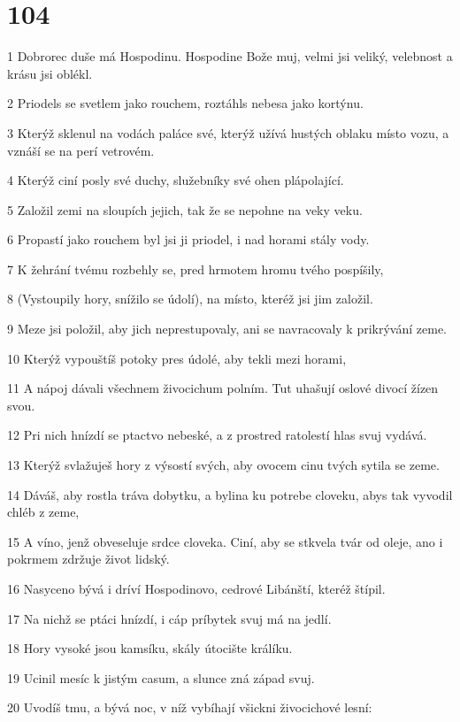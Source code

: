 \chapter{104}

\par 1 Dobrorec duše má Hospodinu. Hospodine Bože muj, velmi jsi veliký, velebnost a krásu jsi oblékl.
\par 2 Priodels se svetlem jako rouchem, roztáhls nebesa jako kortýnu.
\par 3 Kterýž sklenul na vodách paláce své, kterýž užívá hustých oblaku místo vozu, a vznáší se na perí vetrovém.
\par 4 Kterýž ciní posly své duchy, služebníky své ohen plápolající.
\par 5 Založil zemi na sloupích jejich, tak že se nepohne na veky veku.
\par 6 Propastí jako rouchem byl jsi ji priodel, i nad horami stály vody.
\par 7 K žehrání tvému rozbehly se, pred hrmotem hromu tvého pospíšily,
\par 8 (Vystoupily hory, snížilo se údolí), na místo, kteréž jsi jim založil.
\par 9 Meze jsi položil, aby jich neprestupovaly, ani se navracovaly k prikrývání zeme.
\par 10 Kterýž vypouštíš potoky pres údolé, aby tekli mezi horami,
\par 11 A nápoj dávali všechnem živocichum polním. Tut uhašují oslové divocí žízen svou.
\par 12 Pri nich hnízdí se ptactvo nebeské, a z prostred ratolestí hlas svuj vydává.
\par 13 Kterýž svlažuješ hory z výsostí svých, aby ovocem cinu tvých sytila se zeme.
\par 14 Dáváš, aby rostla tráva dobytku, a bylina ku potrebe cloveku, abys tak vyvodil chléb z zeme,
\par 15 A víno, jenž obveseluje srdce cloveka. Ciní, aby se stkvela tvár od oleje, ano i pokrmem zdržuje život lidský.
\par 16 Nasyceno bývá i dríví Hospodinovo, cedrové Libánští, kteréž štípil.
\par 17 Na nichž se ptáci hnízdí, i cáp príbytek svuj má na jedlí.
\par 18 Hory vysoké jsou kamsíku, skály útocište králíku.
\par 19 Ucinil mesíc k jistým casum, a slunce zná západ svuj.
\par 20 Uvodíš tmu, a bývá noc, v níž vybíhají všickni živocichové lesní:
